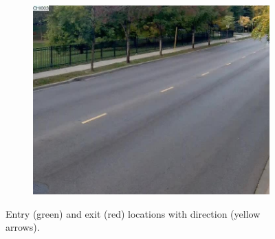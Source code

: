 \begin{figure}
\begin{subfigure}{0.32\linewidth}
            \includegraphics[width=\linewidth]{./img/scene_learning/res/ILCHI_CHI003/ILCHI_CHI003_20151010_075033_051-2.jpg}
        \end{subfigure}
        \caption{Entry (green) and exit (red) locations with direction (yellow arrows).}
        \label{fig:entry-exit-full-1}
\end{figure}
